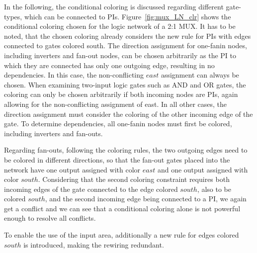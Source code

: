 In the following, the conditional coloring is discussed regarding different gate-types, which can be connected to PIs. Figure~\ref{fig:mux_LN_clr} shows the conditional coloring chosen for the logic network of a 2:1 MUX. It has to be noted, that the chosen coloring already considers the new rule for PIs with edges connected to gates colored south.
The direction assignment for one-fanin nodes, including inverters and fan-out nodes, can be chosen arbitrarily as the PI to which they are connected has only one outgoing edge, resulting in no dependencies. In this case, the non-conflicting $east$ assignment can always be chosen. When examining two-input logic gates such as AND and OR gates, the coloring can only be chosen arbitrarily if both incoming nodes are PIs, again allowing for the non-conflicting assignment of east. In all other cases, the direction assignment must consider the coloring of the other incoming edge of the gate. To determine dependencies, all one-fanin nodes must first be colored, including inverters and fan-outs.

Regarding fan-outs, following the coloring rules, the two outgoing edges need to be colored in different directions, so that the fan-out gates placed into the network have one output assigned with color $east$ and one output assigned with color $south$. Considering that the second coloring constraint requires both incoming edges of the gate connected to the edge colored $south$, also to be colored $south$, and the second incoming edge being connected to a PI, we again get a conflict and we can see that a conditional coloring alone is not powerful enough to resolve all conflicts.

To enable the use of the input area, additionally a new rule for edges colored $south$ is introduced, making the rewiring redundant.

